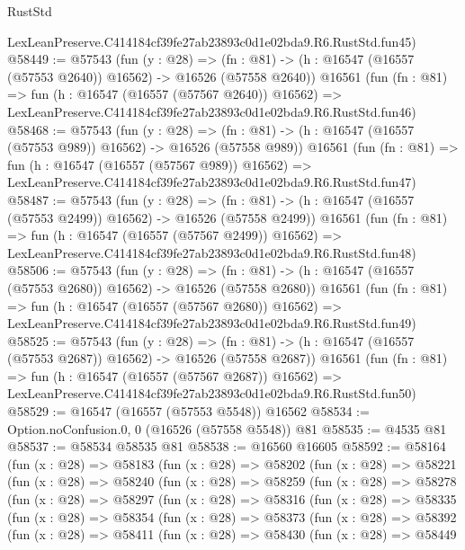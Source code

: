 \begin{lexlean}{RustStd}
\begin{coremodule}
    LexLeanPreserve.C414184cf39fe27ab23893c0d1e02bda9.R6.RustStd.fun45)
@58449 := @57543
    (fun (y : @28) =>
    (fn : @81) -> (h : @16547 (@16557 (@57553 @2640)) @16562) -> @16526 (@57558 @2640))
    @16561
    (fun (fn : @81) =>
    fun (h : @16547 (@16557 (@57567 @2640)) @16562) =>
    LexLeanPreserve.C414184cf39fe27ab23893c0d1e02bda9.R6.RustStd.fun46)
@58468 := @57543
    (fun (y : @28) =>
    (fn : @81) -> (h : @16547 (@16557 (@57553 @989)) @16562) -> @16526 (@57558 @989))
    @16561
    (fun (fn : @81) =>
    fun (h : @16547 (@16557 (@57567 @989)) @16562) =>
    LexLeanPreserve.C414184cf39fe27ab23893c0d1e02bda9.R6.RustStd.fun47)
@58487 := @57543
    (fun (y : @28) =>
    (fn : @81) -> (h : @16547 (@16557 (@57553 @2499)) @16562) -> @16526 (@57558 @2499))
    @16561
    (fun (fn : @81) =>
    fun (h : @16547 (@16557 (@57567 @2499)) @16562) =>
    LexLeanPreserve.C414184cf39fe27ab23893c0d1e02bda9.R6.RustStd.fun48)
@58506 := @57543
    (fun (y : @28) =>
    (fn : @81) -> (h : @16547 (@16557 (@57553 @2680)) @16562) -> @16526 (@57558 @2680))
    @16561
    (fun (fn : @81) =>
    fun (h : @16547 (@16557 (@57567 @2680)) @16562) =>
    LexLeanPreserve.C414184cf39fe27ab23893c0d1e02bda9.R6.RustStd.fun49)
@58525 := @57543
    (fun (y : @28) =>
    (fn : @81) -> (h : @16547 (@16557 (@57553 @2687)) @16562) -> @16526 (@57558 @2687))
    @16561
    (fun (fn : @81) =>
    fun (h : @16547 (@16557 (@57567 @2687)) @16562) =>
    LexLeanPreserve.C414184cf39fe27ab23893c0d1e02bda9.R6.RustStd.fun50)
@58529 := @16547 (@16557 (@57553 @5548)) @16562
@58534 := Option.noConfusion.{0, 0} (@16526 (@57558 @5548)) @81
@58535 := @4535 @81
@58537 := @58534 @58535 @81
@58538 := @16560 @16605
@58592 := @58164
    (fun (x : @28) =>
    @58183
      (fun (x : @28) =>
      @58202
        (fun (x : @28) =>
        @58221
          (fun (x : @28) =>
          @58240
            (fun (x : @28) =>
            @58259
              (fun (x : @28) =>
              @58278
                (fun (x : @28) =>
                @58297
                  (fun (x : @28) =>
                  @58316
                    (fun (x : @28) =>
                    @58335
                      (fun (x : @28) =>
                      @58354
                        (fun (x : @28) =>
                        @58373
                          (fun (x : @28) =>
                          @58392
                            (fun (x : @28) =>
                            @58411
                              (fun (x : @28) =>
                              @58430
                                (fun (x : @28) =>
                                @58449

\end{coremodule}
\end{lexlean}
